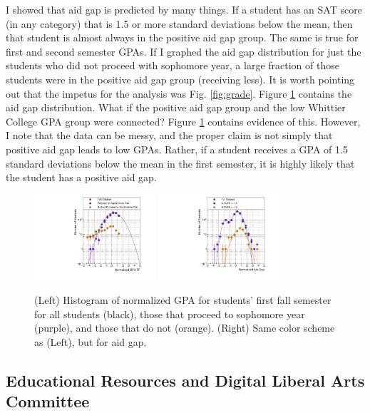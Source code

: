 \documentclass[../../../main.tex]{subfiles}
\begin{document}
I showed that aid gap is predicted by many things.  If a student has an SAT score (in any category) that is 1.5 or more standard deviations below the mean, then that student is almost always in the positive aid gap group.  The same is true for first and second semester GPAs.  If I graphed the aid gap distribution for just the students who did not proceed with sophomore year, a large fraction of those students were in the positive aid gap group (receiving less).  It is worth pointing out that the impetus for the analysis was Fig. \ref{fig:grade}.  Figure \ref{fig:grade2} contains the aid gap distribution.  What if the positive aid gap group and the low Whittier College GPA group were connected?  Figure \ref{fig:grade2} contains evidence of this.  However, I note that the data can be messy, and the proper claim is not simply that positive aid gap leads to low GPAs.  Rather, if a student receives a GPA of 1.5 standard deviations below the mean in the first semester, it is highly likely that the student has a positive aid gap.

\begin{figure}
\centering
\includegraphics[width=0.4\textwidth]{figures/Dec5_plot6.pdf}
\includegraphics[width=0.4\textwidth]{figures/Dec4_plot5.pdf}
\caption{\label{fig:grade2} (Left) Histogram of normalized GPA for students' first fall semester for all students (black), those that proceed to sophomore year (purple), and those that do not (orange).  (Right) Same color scheme as (Left), but for aid gap.}
\end{figure}

\subsection{Educational Resources and Digital Liberal Arts Committee}
\end{document}
